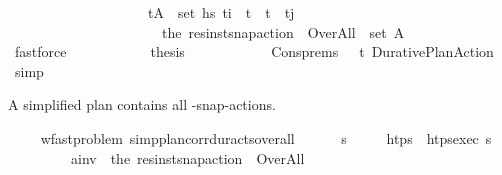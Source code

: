 \begin{isabellebody}
\ \ \ \ \ \ \ \ \ \ \ \ \ \ \ \ \ \ \ \ {\isacharparenleft}{\kern0pt}{\isasymexists}{\isacharparenleft}{\kern0pt}t{\isacharprime}{\kern0pt}{\isacharcomma}{\kern0pt}A{\isacharparenright}{\kern0pt}\ {\isasymin}\ set\ hs{\isachardot}{\kern0pt}\ t\isactrlsub i\ {\isacharless}{\kern0pt}\ t{\isacharprime}{\kern0pt}\ {\isasymand}\ t{\isacharprime}{\kern0pt}\ {\isacharless}{\kern0pt}\ t\isactrlsub j\ {\isasymand}\ \isanewline
\ \ \ \ \ \ \ \ \ \ \ \ \ \ \ \ \ \ \ \ \ \ {\isacharparenleft}{\kern0pt}the\ {\isacharparenleft}{\kern0pt}res{\isacharunderscore}{\kern0pt}inst{\isacharunderscore}{\kern0pt}snap{\isacharunderscore}{\kern0pt}action\ {\isasympi}{\isacharprime}{\kern0pt}\ Over{\isacharunderscore}{\kern0pt}All{\isacharparenright}{\kern0pt}{\isacharparenright}{\kern0pt}\ {\isasymin}\ set\ A{\isacharparenright}{\kern0pt}{\isachardoublequoteclose}\isanewline
\ \ \ \ \ \ \ \ \ \ \isamarkupfalse%
\ fastforce\isanewline
\ \ \ \ \ \ \ \ \isamarkupfalse%
\ \isamarkupfalse%
\ {\isacharquery}{\kern0pt}thesis\isanewline
\ \ \ \ \ \ \ \ \ \ \isamarkupfalse%
\ Cons{\isachardot}{\kern0pt}prems\ {\isacartoucheopen}{\isasympi}\ {\isacharequal}{\kern0pt}\ {\isacharparenleft}{\kern0pt}t\isactrlsub {\isasympi}{\isacharcomma}{\kern0pt}{\isasympi}{\isacharprime}{\kern0pt}{\isacharparenright}{\kern0pt}{\isacartoucheclose}\ Durative{\isacharunderscore}{\kern0pt}Plan{\isacharunderscore}{\kern0pt}Action\ \isamarkupfalse%
\ simp\isanewline
\ \ \ \ \isamarkupfalse%
\isanewline
\ \ \isamarkupfalse%
%
\endisatagproof
{\isafoldproof}%
%
\isadelimproof
%
\endisadelimproof
%
\begin{isamarkuptext}%
A simplified plan contains all -snap-actions.%
\end{isamarkuptext}\isamarkuptrue%
\ \ \isamarkupfalse%
\ {\isacharparenleft}{\kern0pt}\ wf{\isacharunderscore}{\kern0pt}ast{\isacharunderscore}{\kern0pt}problem{\isacharparenright}{\kern0pt}\ simp{\isacharunderscore}{\kern0pt}plan{\isacharunderscore}{\kern0pt}corr{\isacharunderscore}{\kern0pt}dur{\isacharunderscore}{\kern0pt}acts{\isacharunderscore}{\kern0pt}overall{\isacharcolon}{\kern0pt}\isanewline
\ \ \ \ \ {\isasympi}\ {\isasympi}s\isanewline
\ \ \ \ \ {\isachardoublequoteopen}htps\ {\isasymequiv}\ htps{\isacharunderscore}{\kern0pt}exec\ {\isasympi}s{\isachardoublequoteclose}\ \isanewline
\ \ \ \ \ \ \ \ \ {\isachardoublequoteopen}a\isactrlsub i\isactrlsub n\isactrlsub v\ {\isasymequiv}\ the\ {\isacharparenleft}{\kern0pt}res{\isacharunderscore}{\kern0pt}inst{\isacharunderscore}{\kern0pt}snap{\isacharunderscore}{\kern0pt}action\ {\isasympi}\ Over{\isacharunderscore}{\kern0pt}All{\isacharparenright}{\kern0pt}{\isachardoublequoteclose}\isanewline

\end{isabellebody}
